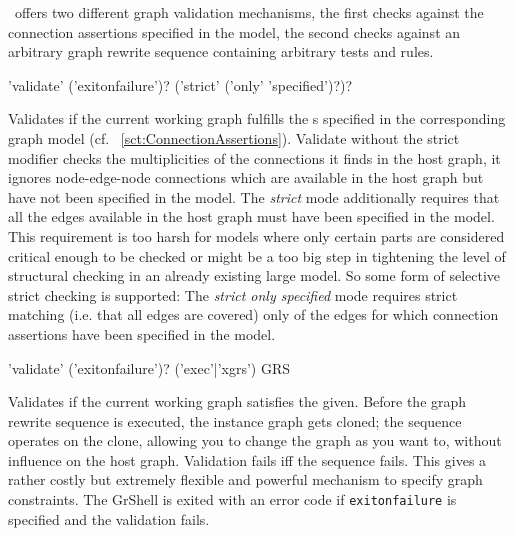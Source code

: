 \GrG\ offers two different graph validation mechanisms,
the first checks against the connection assertions specified in the model,
the second checks against an arbitrary graph rewrite sequence containing arbitrary tests and rules.

\begin{rail}
  'validate' ('exitonfailure')? ('strict' ('only' 'specified')?)?
\end{rail}
Validates if the current working graph fulfills the s specified in the corresponding graph model (cf. ~\ref{sct:ConnectionAssertions}).
Validate without the strict modifier checks the multiplicities of the connections it finds in the host graph,
it ignores node-edge-node connections which are available in the host graph but have not been specified in the model.
The \emph{strict} mode additionally requires that all the edges available in the host graph must have been specified in the model.
This requirement is too harsh for models where only certain parts are considered critical enough to be checked
or might be a too big step in tightening the level of structural checking in an already existing large model.
So some form of selective strict checking is supported:
The \emph{strict only specified} mode requires strict matching (i.e. that all edges are covered) only of the edges for which connection assertions have been specified in the model.

\begin{rail}
  'validate' ('exitonfailure')? ('exec'|'xgrs') GRS
\end{rail}
Validates if the current working graph satisfies the  given.
Before the graph rewrite sequence is executed, the instance graph gets cloned;
the sequence operates on the clone, allowing you to change the graph as you want to, without influence on the host graph.
Validation fails iff the sequence fails.
This gives a rather costly but extremely flexible and powerful mechanism to specify graph constraints.
The GrShell is exited with an error code if \texttt{exitonfailure} is specified and the validation fails.

